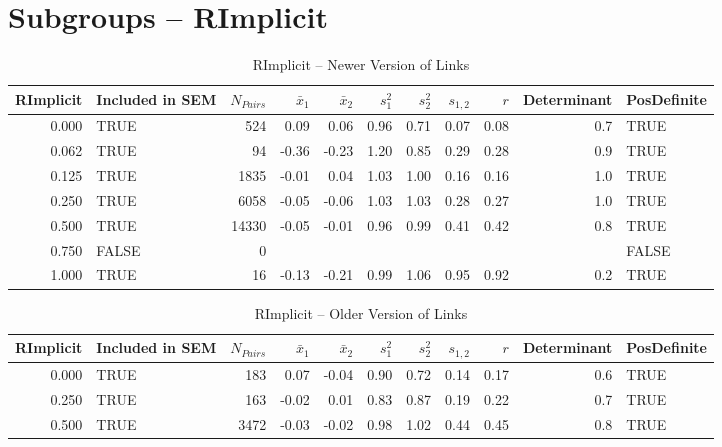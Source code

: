 \documentclass{article}\usepackage[]{graphicx}\usepackage[]{color}
\begin{document}
\section{Subgroups --  RImplicit }%
\begin{table}[ht]
\centering
\begin{tabular}{rlrrrrrrrrl}
  \hline
RImplicit & Included in SEM & $N_{Pairs}$ & $\bar{x}_1$ & $\bar{x}_2$ & $s_1^2$ & $s_2^2$ & $s_{1,2}$ & $r$ & Determinant & PosDefinite \\ 
  \hline
0.000 & TRUE & 524 & 0.09 & 0.06 & 0.96 & 0.71 & 0.07 & 0.08 & 0.7 & TRUE \\ 
  0.062 & TRUE & 94 & -0.36 & -0.23 & 1.20 & 0.85 & 0.29 & 0.28 & 0.9 & TRUE \\ 
  0.125 & TRUE & 1835 & -0.01 & 0.04 & 1.03 & 1.00 & 0.16 & 0.16 & 1.0 & TRUE \\ 
  0.250 & TRUE & 6058 & -0.05 & -0.06 & 1.03 & 1.03 & 0.28 & 0.27 & 1.0 & TRUE \\ 
  0.500 & TRUE & 14330 & -0.05 & -0.01 & 0.96 & 0.99 & 0.41 & 0.42 & 0.8 & TRUE \\ 
  0.750 & FALSE & 0 &  &  &  &  &  &  &  & FALSE \\ 
  1.000 & TRUE & 16 & -0.13 & -0.21 & 0.99 & 1.06 & 0.95 & 0.92 & 0.2 & TRUE \\ 
   \hline
\end{tabular}
\caption{RImplicit -- Newer Version of Links} 
\end{table}
\begin{table}[ht]
\centering
\begin{tabular}{rlrrrrrrrrl}
  \hline
RImplicit & Included in SEM & $N_{Pairs}$ & $\bar{x}_1$ & $\bar{x}_2$ & $s_1^2$ & $s_2^2$ & $s_{1,2}$ & $r$ & Determinant & PosDefinite \\ 
  \hline
0.000 & TRUE & 183 & 0.07 & -0.04 & 0.90 & 0.72 & 0.14 & 0.17 & 0.6 & TRUE \\ 
  0.250 & TRUE & 163 & -0.02 & 0.01 & 0.83 & 0.87 & 0.19 & 0.22 & 0.7 & TRUE \\ 
  0.500 & TRUE & 3472 & -0.03 & -0.02 & 0.98 & 1.02 & 0.44 & 0.45 & 0.8 & TRUE \\ 
   \hline
\end{tabular}
\caption{RImplicit -- Older Version of Links} 
\end{table}
\end{document}
